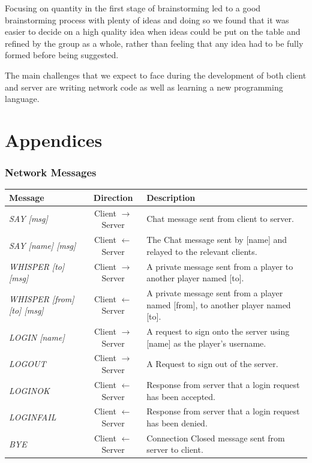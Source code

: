 \documentclass[a4paper]{article}
\begin{document}
Focusing on quantity in the first stage of brainstorming led to a good brainstorming process with plenty of ideas and doing so we found that it was easier to decide on a high 
quality idea when ideas could be put on the table and refined by the group as a whole, rather than feeling that any idea had to be fully formed before being suggested.

The main challenges that we expect to face during the development of both client and server are writing network code as well as learning a new programming language.
\newpage
\part{Appendices}
\begin{appendices}
\section{Network Messages}\label{app:NetworkMessages}
\begin{longtable}{|l|c|p{8 cm}|}
\hline
Message & Direction & Description\\
\hline
\endhead
\textit{SAY [msg]} & Client $\rightarrow$ Server & Chat message sent from client to server.\\
\hline
\textit{SAY [name] [msg]} & Client $\leftarrow$ Server & The Chat message sent by [name] and relayed to the relevant clients.\\
\hline
\textit{WHISPER [to] [msg]} & Client $\rightarrow$ Server & A private message sent from a player to another player named [to].\\
\hline
\textit{WHISPER [from] [to] [msg]} & Client $\leftarrow$ Server & A private message sent from a player named [from], to another player named [to].\\
\hline
\textit{LOGIN [name]} & Client $\rightarrow$ Server & A request to sign onto the server using [name] as the player's username.\\
\hline
\textit{LOGOUT} & Client $\rightarrow$ Server & A Request to sign out of the server.\\
\hline
\textit{LOGINOK} & Client $\leftarrow$ Server & Response from server that a login request has been accepted.\\
\hline
\textit{LOGINFAIL} & Client $\leftarrow$ Server & Response from server that a login request has been denied.\\
\hline
\textit{BYE} & Client $\leftarrow$ Server & Connection Closed message sent from server to client.\\

\end{longtable}
\end{appendices}
\end{document}
